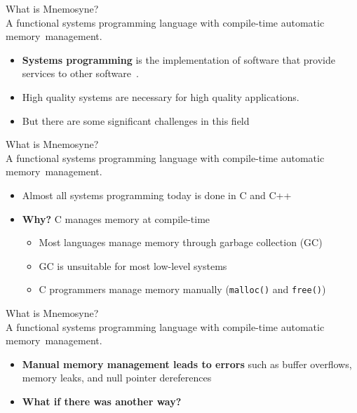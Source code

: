 \documentclass{beamer}
\begin{document}
\begin{frame}
\huge{What is Mnemosyne?}\\
\large{A functional \alert<1->{systems programming} language with compile-time automatic memory~management.}
\normalsize
\begin{itemize}
\item<1->
    \textbf{Systems programming} is the implementation of software that provide services to other software~\cite{Narten:2003:SP:1074100.1074850,Shapiro:2006:PLC:1215995.1216004}.
    \item <3-> High quality systems are necessary for high quality applications.
\item <4-> But there are some significant challenges in this field~\cite{whyrust,Shapiro:2006:PLC:1215995.1216004}
\end{itemize}
\end{frame}

\begin{frame}
\huge{What is Mnemosyne?}\\
\large{A functional systems programming language with \alert<1->{compile-time automatic memory~management}.}\normalsize
\begin{itemize}
    \item Almost all systems programming today is done in C and C++
    \item<2-> \textbf{Why?} C manages memory at compile-time
    \begin{itemize}
        \item<3-> Most languages manage memory through garbage collection (GC)~\cite{Bartley:2003:GC:1074100.1074419}
        \item<3-> GC is unsuitable for most low-level systems
        \item<3-> C programmers manage memory manually (\texttt{malloc()} and \texttt{free()})
    \end{itemize}
\end{itemize}
\end{frame}

\begin{frame}
\huge{What is Mnemosyne?}\\
\large{A functional systems programming language with \alert<1->{compile-time automatic memory~management}.}\normalsize
\begin{itemize}
    \item \textbf{Manual memory management leads to errors} such as buffer overflows, memory leaks, and null pointer dereferences
    \item \textbf{What if there was another way?}
\end{itemize}
\end{frame}
\end{document}
